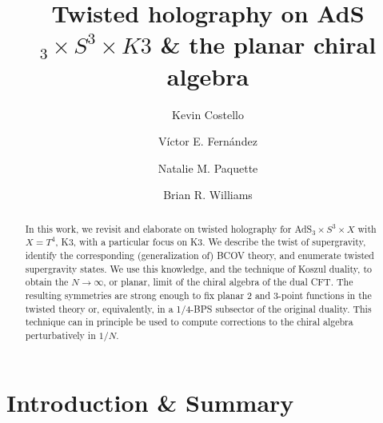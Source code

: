 \documentclass[11pt]{amsart}
\title{Twisted holography on AdS$_3 \times S^3 \times K3$ \& the planar chiral algebra}
\author{Kevin Costello}
\author{Víctor E. Fernández}
\author{Natalie M. Paquette}
\author{Brian R. Williams}
\begin{document}
\maketitle

\begin{abstract} %
In this work, we revisit and elaborate on twisted holography for AdS$_3 \times S^3 \times X$ with $X= T^4$, K3, with a particular focus on K3. We describe the twist of supergravity, identify the corresponding (generalization of) BCOV theory, and enumerate twisted supergravity states. We use this knowledge, and the technique of Koszul duality, to obtain the $N \rightarrow \infty$, or planar, limit of the chiral algebra of the dual CFT. The resulting symmetries are strong enough to fix planar 2 and 3-point functions in the twisted theory or, equivalently, in a 1/4-BPS subsector of the original duality. This technique can in principle be used to compute corrections to the chiral algebra perturbatively in $1/N$.
\end{abstract}

\tableofcontents

\section{Introduction \& Summary}
\end{document}
